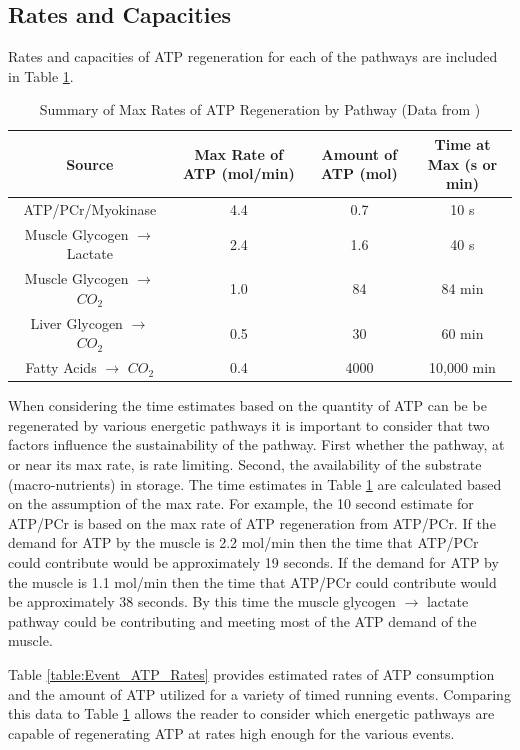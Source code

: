 \subsection{Rates and Capacities}

Rates and capacities of ATP regeneration for each of the pathways are included in Table \ref{table:ATP_Rates}.

\begin{table}[h!]
\centering
\begin{tabular}{||c c c c||} 
 \hline
Source & Max Rate of ATP (mol/min) & Amount of ATP (mol) & Time at Max (s or min)\\ [0.5ex] 
 \hline\hline
 ATP/PCr/Myokinase & 4.4  & 0.7 & 10 s \\
 Muscle Glycogen $\rightarrow$ Lactate &  2.4 & 1.6 & 40 s \\ 
 Muscle Glycogen $\rightarrow$ $CO_2$ & 1.0 & 84 & 84 min\\
 Liver Glycogen $\rightarrow$ $CO_2$  & 0.5 & 30 & 60 min \\ 
 Fatty Acids $\rightarrow$ $CO_2$ & 0.4 & 4000 & 10,000 min \\[1ex] 
 \hline
\end{tabular}
\caption{Summary of Max Rates of ATP Regeneration by Pathway (\footnotesize{Data from \cite{feher_quantitative_2017}})}
\label{table:ATP_Rates}
\end{table}

When considering the time estimates based on the quantity of ATP can be be regenerated by various energetic pathways it is important to consider that two factors influence the sustainability of the pathway. First whether the pathway, at or near its max rate, is rate limiting. Second, the availability of the substrate (macro-nutrients) in storage. The time estimates in Table \ref{table:ATP_Rates} are calculated based on the assumption of the max rate. For example, the 10 second estimate for ATP/PCr is based on the max rate of ATP regeneration from ATP/PCr. If the demand for ATP by the muscle is 2.2 mol/min then the time that ATP/PCr could contribute would be approximately 19 seconds. If the demand for ATP by the muscle is 1.1 mol/min then the time that ATP/PCr could contribute would be approximately 38 seconds. By this time the muscle glycogen $\rightarrow$ lactate pathway could be contributing and meeting most of the ATP demand of the muscle. 


Table \ref{table:Event_ATP_Rates} provides estimated rates of ATP consumption and the amount of ATP utilized for a variety of timed running events. Comparing this data to Table \ref{table:ATP_Rates} allows the reader to consider which energetic pathways are capable of regenerating ATP at rates high enough for the various events.


